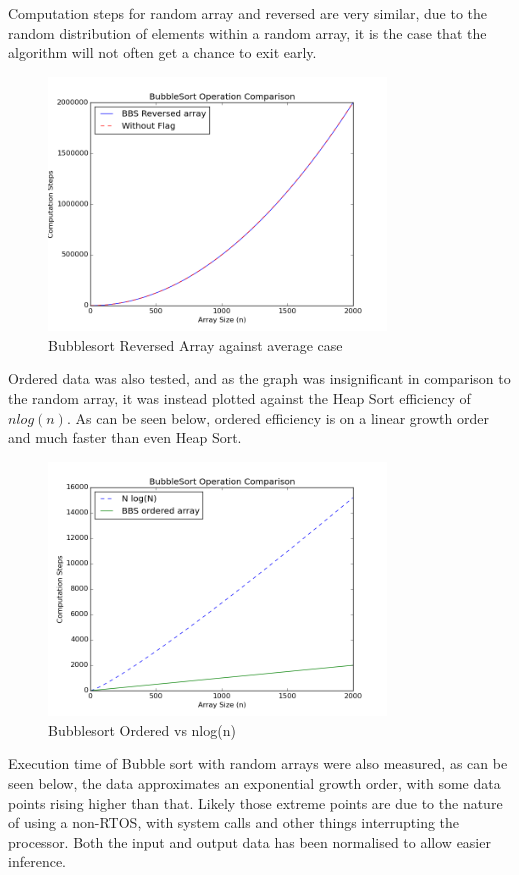 \documentclass[]{article}
\begin{document}
Computation steps for random array and reversed are very similar, due to the random distribution of elements within a random array, it is the case that the algorithm will not often get a chance to exit early.
\begin{figure}[H]\label{MeasuredReversed}
	\centering
	\caption{Bubblesort Reversed Array against average case}
	\includegraphics[width=0.8\textwidth]{Reversed.png}
\end{figure}
Ordered data was also tested, and as the graph was insignificant in comparison to the random array, it was instead plotted against the Heap Sort efficiency of $nlog(n)$. As can be seen below, ordered efficiency is on a linear growth order and much faster than even Heap Sort.
\begin{figure}[H]\label{MeasuredOrdered}
	\centering
	\caption{Bubblesort Ordered vs nlog(n)}
	\includegraphics[width=0.8\textwidth]{Ordered.png}
\end{figure}
Execution time of Bubble sort with random arrays were also measured, as can be seen below, the data approximates an exponential growth order, with some data points rising higher than that. Likely those extreme points are due to the nature of using a non-RTOS, with system calls and other things interrupting the processor. Both the input and output data has been normalised to allow easier inference.
\end{document}
